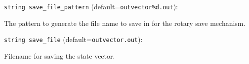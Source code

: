 \item\verb+string save_file_pattern+ {\rm(default=\verb|outvector%d.out|)}:

The pattern to generate the file name to save in for
the rotary save mechanism.

\item\verb+string save_file+ {\rm(default=\verb|outvector.out|)}:

Filename for saving the state vector.

